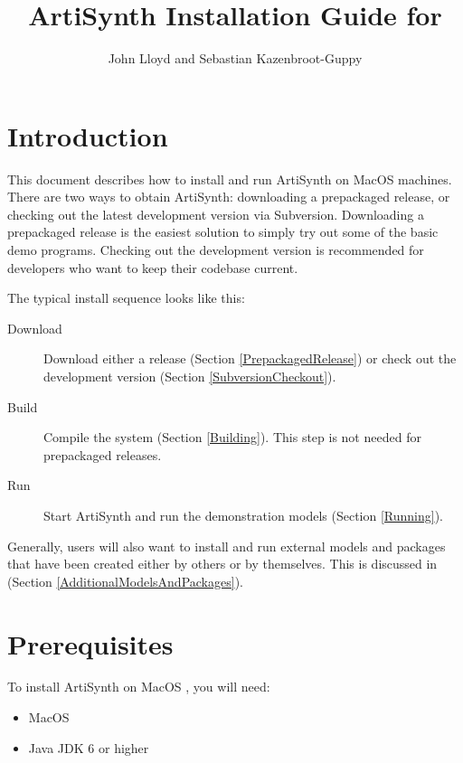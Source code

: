 \documentclass{article}
\title{ArtiSynth Installation Guide for \SYSTEM}
\author{John Lloyd and Sebastian Kazenbroot-Guppy}
\date{}
\def\FULLSYSTEM{MacOS }
\def\SYSTEM{MacOS }
\begin{document}
\maketitle

\iflatexml{\large\today}\fi


\tableofcontents

\section{Introduction}

This document describes how to install and run ArtiSynth on \FULLSYSTEM
machines. There are two ways to obtain ArtiSynth: downloading
a prepackaged release, or checking out the latest development version
via Subversion. Downloading a prepackaged release is the easiest
solution to simply try out some of the basic demo programs. Checking
out the development version is recommended for developers who want to
keep their codebase current.

The typical install sequence looks like this:

\begin{description}

\item[Download]
Download either a release (Section \ref{PrepackagedRelease}) or 
check out the development version (Section \ref{SubversionCheckout}).

\item[Build]
Compile the system (Section \ref{Building}). This
step is not needed for prepackaged releases.

\item[Run] 
Start ArtiSynth and run the demonstration models (Section \ref{Running}).

\end{description}

Generally, users will also want to install and run external models and
packages that have been created either by others or by themselves.
This is discussed in (Section \ref{AdditionalModelsAndPackages}).

\section{Prerequisites}

To install ArtiSynth on \SYSTEM, you will need:

\begin{itemize}

\item \SYSTEM

\item Java JDK 6 or higher

\end{itemize}
\end{document}
